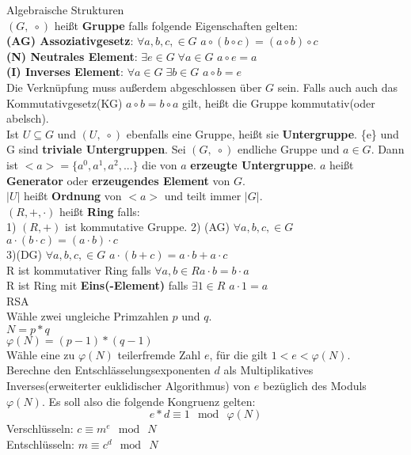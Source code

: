 \documentclass[11pt]{article}
\begin{document}
Algebraische Strukturen\\
$(G,\; \circ)$ hei{\ss}t {\bfseries Gruppe} falls folgende Eigenschaften gelten:\\
{\bfseries (AG) Assoziativgesetz}: $\forall a,b,c, \in G$ \hspace{5mm} $a \circ (b \circ c) = (a \circ b) \circ c$\\
{\bfseries (N) Neutrales Element}: $\exists e \in G\; \forall a \in G$\hspace{5mm} $a \circ e = a$\\
{\bfseries (I) Inverses Element}: $\forall a \in G\; \exists b \in G$\hspace{5mm} $a \circ b = e$\\
Die Verkn{\"u}pfung muss au{\ss}erdem abgeschlossen {\"u}ber $G$ sein.
Falls auch auch das Kommutativgesetz(KG) $a \circ b = b \circ a$ gilt, hei{\ss}t die Gruppe kommutativ(oder abelsch).\\
Ist $U \subseteq G$ und $(U,\; \circ)$ ebenfalls eine Gruppe, hei{\ss}t sie {\bfseries Untergruppe}. \{e\} und G sind {\bfseries triviale Untergruppen}.
Sei $(G,\; \circ)$ endliche Gruppe und $a\in G$. Dann ist $<a> = \{a^0, a^1, a^2,...\}$ die von $a$ {\bfseries erzeugte Untergruppe}. $a$ hei{\ss}t {\bfseries Generator} oder {\bfseries erzeugendes Element} von $G$.\\
$\mathopen| U \mathclose|$ hei{\ss}t {\bfseries Ordnung} von $<a>$ und teilt immer $\mathopen| G \mathclose|$.\\
$(R,+,\cdot)$ hei{\ss}t {\bfseries Ring} falls:\\
1) $(R,+)$ ist kommutative Gruppe. \hspace{2mm} 2) (AG) $\forall a,b,c, \in G$ \hspace{3mm} $a \cdot (b \cdot c) = (a \cdot b) \cdot c$ \\
3)(DG) $\forall a,b,c, \in G$ \hspace{3mm} $a \cdot (b + c) = a \cdot b + a \cdot c$\\
R ist kommutativer Ring falls $\forall a,b \in R$\hspace{3mm}$a \cdot b = b \cdot a$\\
R ist Ring mit {\bfseries Eins(-Element)} falls $\exists 1 \in R$\hspace{3mm} $a\cdot 1 = a$\\


RSA\\
W{\"a}hle zwei ungleiche Primzahlen $p$ und $q$.\\
$N=p * q$\\
$\varphi (N)=(p-1) * (q-1)$\\
W{\"a}hle eine zu $\varphi (N)$ teilerfremde Zahl $e$, f{\"u}r die gilt $1<e<\varphi (N)$.\\
Berechne den Entschl{\"a}sselungsexponenten $d$ als Multiplikatives Inverses(erweiterter euklidischer Algorithmus) von $e$ bez{\"u}glich des Moduls $\varphi (N)$. Es soll also die folgende Kongruenz gelten: $$ e * d\equiv 1\ {\bmod \ }\varphi (N)$$
Verschl{\"u}sseln: $c\equiv m^{e}\ {\bmod \ }N$\\
Entschl{\"u}sseln: $m\equiv c^{d}\ {\bmod \ }N$\\
    
\end{document}
